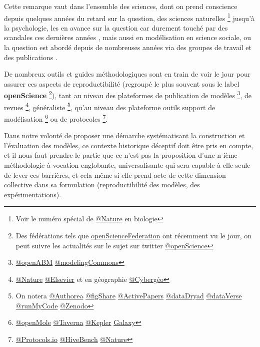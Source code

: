 {Cette remarque vaut dans l'ensemble des sciences, dont on prend conscience depuis quelques années du retard sur la question, des sciences naturelles \footnote{Voir le numéro spécial de \href{http://www.nature.com/nature/focus/reproducibility/index.html}{@Nature} en biologie} jusqu'à la psychologie, les  en avance sur la question car durement touché par des scandales ces dernières années \autocite{Steen2011}, mais aussi en modélisation en science sociale, ou la question est abordé depuis de nombreuses années via des groupes de travail et des publications \autocite{Hales2003} \autocite{Rouchier2013}.

De nombreux outils et guides méthodologiques \autocite{Prlic2012} \autocite{Bourne2013} \autocite{Goodman2014} \autocite{Sandve2013} sont en train de voir le jour pour assurer ces aspects de reproductibilité (regroupé le plus souvent sous le label \textbf{openScience} \footnote{Des fédérations tels que \href{http://opensciencefederation.com/}{openScienceFederation} ont récemment vu le jour, on peut suivre les actualités sur le sujet sur twitter \href{https://twitter.com/openscience}{@openScience}}), tant au niveau des plateformes de publication de modèles 
\footnote{\href{http://www.openabm.org/}{@openABM} \href{http://modelingcommons.org}{@modelingCommons}}, de revues 
\footnote{\href{http://www.nature.com/scientificdata/about/}{@Nature} \href{http://www.elsevier.com/physical-sciences/computer-science/executable-papers}{@Elsevier} et en géographie \href{http://cybergeo.revues.org/}{@Cybergéo}}, généraliste 
\footnote{On notera \href{https://authorea.com/}{@Authorea} \href{http://figshare.com/}{@figShare} \href{http://www.activepapers.org/}{@ActivePapers} \href{http://datadryad.org/}{@dataDryad} \href{http://http://thedata.org/}{@dataVerse} \href{http://www.runmycode.org/}{@runMyCode} \href{http://zenodo.org/}{@Zenodo}}, qu'au niveau des plateforme outils support de modélisation 
\footnote{\href{http://www.openmole.org/}{@openMole} \href{http://www.taverna.org.uk/}{@Taverna} \href{https://kepler-project.org/}{@Kepler} \href{http://galaxyproject.org/}{Galaxy}} ou de protocoles 
\footnote{\href{http://www.protocols.io/}{@Protocols.io} \href{https://www.hivebench.com/}{@HiveBench} \href{http://www.nature.com/protocolexchange}{@Nature}}. 


Dans notre volonté de proposer une démarche systématisant la construction et l'évaluation des modèles, ce contexte historique déceptif doit être pris en compte, et il nous faut prendre le partie que ce n'est pas la proposition d'une n-ième méthodologie à vocation englobante, universalisante qui sera capable à elle seule de lever ces barrières, et cela même si elle prend acte de cette dimension collective dans sa formulation (reproductibilité des modèles, des expérimentations).

}
